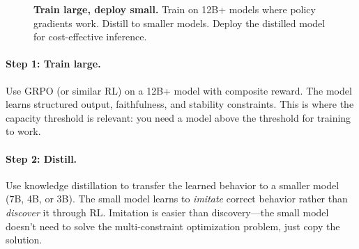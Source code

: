 \documentclass[11pt]{article}
\begin{document}
\begin{figure}[t]
\centering
{}
\caption{\textbf{Train large, deploy small.} Train on 12B+ models where policy gradients work. Distill to smaller models. Deploy the distilled model for cost-effective inference.}
\label{fig:pipeline}
\end{figure}

\paragraph{Step 1: Train large.}
Use GRPO (or similar RL) on a 12B+ model with composite reward.
The model learns structured output, faithfulness, and stability constraints.
This is where the capacity threshold is relevant: you need a model above the threshold for training to work.

\paragraph{Step 2: Distill.}
Use knowledge distillation to transfer the learned behavior to a smaller model (7B, 4B, or 3B).
The small model learns to \emph{imitate} correct behavior rather than \emph{discover} it through RL.
Imitation is easier than discovery---the small model doesn't need to solve the multi-constraint optimization problem, just copy the solution.
\end{document}
